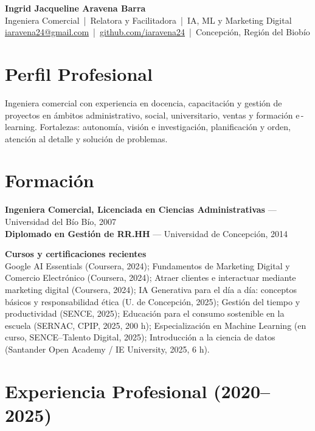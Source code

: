 \documentclass[a4paper,10pt]{article}
\begin{document}
\begin{center}
  {\LARGE \textbf{Ingrid Jacqueline Aravena Barra}}\\[4pt]
  {\color{muted}Ingeniera Comercial \,|\, Relatora y Facilitadora \,|\, IA, ML y Marketing Digital}\\[2pt]
  \href{mailto:iaravena24@gmail.com}{iaravena24@gmail.com} \,|\, 
  \href{https://github.com/iaravena24}{github.com/iaravena24} \,|\, Concepción, Región del Biobío
\end{center}

\vspace{1.2em}

\section*{Perfil Profesional}
Ingeniera comercial con experiencia en docencia, capacitación y gestión de proyectos en ámbitos administrativo, social, universitario, ventas y formación e\,-learning. Fortalezas: autonomía, visión e investigación, planificación y orden, atención al detalle y solución de problemas.

\section*{Formación}
\textbf{Ingeniera Comercial, Licenciada en Ciencias Administrativas} — Universidad del Bío Bío, 2007\\
\textbf{Diplomado en Gestión de RR.HH} — Universidad de Concepción, 2014

\vspace{0.8em}
\textbf{Cursos y certificaciones recientes}\\
Google AI Essentials (Coursera, 2024); Fundamentos de Marketing Digital y Comercio Electrónico (Coursera, 2024); 
Atraer clientes e interactuar mediante marketing digital (Coursera, 2024); 
IA Generativa para el día a día: conceptos básicos y responsabilidad ética (U. de Concepción, 2025);
Gestión del tiempo y productividad (SENCE, 2025); 
Educación para el consumo sostenible en la escuela (SERNAC, CPIP, 2025, 200 h);
Especialización en Machine Learning (en curso, SENCE–Talento Digital, 2025); 
Introducción a la ciencia de datos (Santander Open Academy / IE University, 2025, 6 h).

\section*{Experiencia Profesional (2020–2025)}
\end{document}
